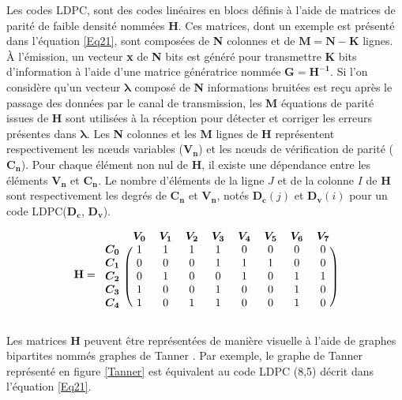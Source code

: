 \documentclass[../main.tex]{subfiles}
\begin{document}
Les codes LDPC, sont des codes linéaires en blocs définis à l’aide de matrices de parité de faible densité nommées \textbf{H}. Ces matrices, dont un exemple est présenté dans l’équation \ref{Eq21}, sont composées de \textbf{N} colonnes et de $\bm{M=N-K}$ lignes. À l’émission, un vecteur \textbf{x} de \textbf{N} bits est généré pour transmettre \textbf{K} bits d’information à l’aide d’une matrice génératrice nommée $\bm{G=H^{-1}}$. Si l'on considère qu'un vecteur $\bm{\lambda}$ composé de \textbf{N} informations bruitées est reçu après le passage des données par le canal de transmission, les \textbf{M} équations de parité issues de \textbf{H} sont utilisées à la réception pour détecter et corriger les erreurs présentes dans $\bm{\lambda}$. Les \textbf{N} colonnes et les \textbf{M} lignes de \textbf{H} représentent respectivement les nœuds variables ($\bm{V_n}$) et les nœuds de vérification de parité ($\bm{C_n}$). Pour chaque élément non nul de \textbf{H}, il existe une dépendance entre les éléments $\bm{V_n}$ et $\bm{C_n}$. Le nombre d’éléments de la ligne $J$ et de la colonne $I$ de \textbf{H} sont respectivement les degrés de $\bm{C_n}$ et $\bm{V_n}$, notés $\bm{D_c}(j)$ et $\bm{D_v}(i)$ pour un code LDPC($\bm{D_c}$, $\bm{D_v}$).

\begin{equation}
\mathbf{H}=
\begin{blockarray}{ccccccccc}
     & \bm{V_0} & \bm{V_1} & \bm{V_2} & \bm{V_3} & \bm{V_4} & \bm{V_5} & \bm{V_6} & \bm{V_7} \\
    \begin{block}{c(cccccccc)}
      \bm{C_0} & 1  & 1  & 1  & 1  & 0  & 0  & 0  & 0 \\
      \bm{C_1} & 0  & 0  & 0  & 1  & 1  & 1  & 0  & 0 \\
      \bm{C_2} & 0  & 1  & 0  & 0  & 1  & 0  & 1  & 1 \\
      \bm{C_3} & 1  & 0  & 0  & 1  & 0  & 0  & 1  & 0 \\
      \bm{C_4} & 1  & 0  & 1  & 1  & 0  & 0  & 1  & 0 \\
    \end{block}
    \end{blockarray}
\label{Eq21}
\end{equation}

Les matrices \textbf{H} peuvent être représentées de manière visuelle à l’aide de graphes bipartites nommés graphes de Tanner \cite{Tanner}. Par exemple, le graphe de Tanner représenté en figure \ref{Tanner} est équivalent au code LDPC (8,5) décrit dans l’équation \ref{Eq21}.
\end{document}
